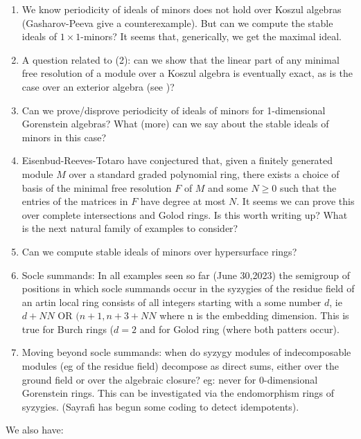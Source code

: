 \documentclass[a4,12pt]{amsart}
\numberwithin{equation}{section}
\theoremstyle{definition}
\theoremstyle{remark}
\numberwithin{equation}{section}
\begin{document}
\begin{enumerate}


\item We know periodicity of ideals of minors does not hold over Koszul algebras (Gasharov-Peeva give a counterexample). But can we compute the stable ideals of $1 \times 1$-minors? It seems that, generically, we get the maximal ideal. 
\item A question related to (2): can we show that the linear part of any minimal free resolution of a module over a Koszul algebra is eventually exact, as is the case over an exterior algebra (see \cite[Theorem 3.1]{EFS})?

\item Can we prove/disprove periodicity of ideals of minors for 1-dimensional Gorenstein algebras? What (more) can we say about the stable ideals of minors in this case?

\item Eisenbud-Reeves-Totaro have conjectured that, given a finitely generated module $M$ over a standard graded polynomial ring, there exists a choice of basis of the minimal free resolution $F$ of $M$ and some $N \ge 0$ such that the entries of the matrices in $F$ have degree at most $N$. It seems we can prove this over complete intersections and Golod rings. Is this worth writing up? What is the next natural family of examples to consider?

\item Can we compute stable ideals of minors over hypersurface rings?

\item Socle summands: In all examples seen so far (June 30,2023) the semigroup of positions in which socle summands occur
in the syzygies of the residue field of an artin local ring
consists of all integers starting with a some number $d$, ie $d+NN$ OR $(n+1, n+3+NN$ where n is the embedding dimension. This is true for Burch rings ($d=2$ and for
Golod ring (where both patters occur).

\item Moving beyond socle summands: when do syzygy modules of indecomposable modules (eg of the residue field) decompose as direct sums, either over the ground field or over the algebraic closure? eg: never for 0-dimensional Gorenstein rings. This can be investigated via the endomorphism rings of syzygies. (Sayrafi has begun some coding to detect idempotents).
\end{enumerate}

We also have:
\end{document}
